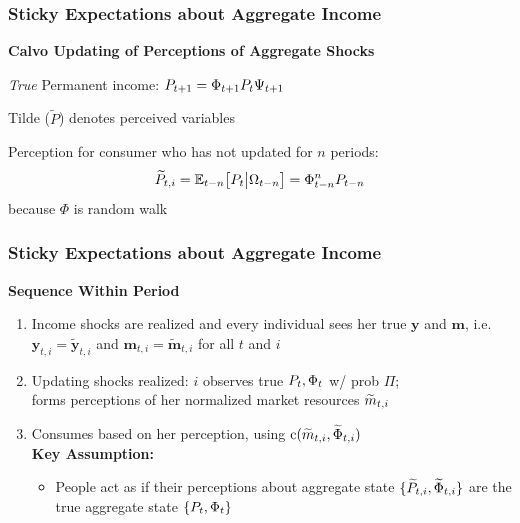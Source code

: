 \documentclass{beamer}\usepackage{dcolumn}
\newcommand{\jemph}[1]{{\color{StataDarkBlue}#1}}
\newcommand{\jbemph}[1]{\textbf{\color{SlideNavy}#1}}
\providecommand{\perc}[1]{\widetilde{#1}}
\providecommand{\jemph}[1]{{\color{jirkasblue}#1}}
\begin{document}
\begin{frame}
\frametitle{Sticky Expectations about Aggregate Income}

\jbemph{\large Calvo Updating of Perceptions of Aggregate Shocks}\\
\bi
\item {\it True} Permanent income: ${P}_{t+1} =  \Phi_{t+1} {P}_{t}\Psi_{t+1}$\\
\item Tilde ($\perc{P}$) denotes perceived variables
\item \jemph{Perception for consumer who has not updated for $n$ periods:}
$$
  \perc{P}_{t,i}=\Ex_{t-n}\big[P_t\big\vert\Omega_{t-n}\big]=\Phi_{t-n}^nP_{t-n}
$$
because $\Phi$ is random walk 
\ei
\end{frame}



\begin{frame}
\frametitle{Sticky Expectations about Aggregate Income}

\jbemph{\large Sequence Within Period}\\
\begin{enumerate}
\setlength{\itemsep}{2mm}
\item Income shocks are realized and every individual sees her true $\mathbf{y}$ and $\mathbf{m}$,
i.e.\ $\mathbf{y}_{t,i}=\perc{\mathbf{y}}_{t,i}$ and $\mathbf{m}_{t,i}=\perc{\mathbf{m}}_{t,i}$ for all $t$ and $i$

\item Updating shocks realized: $i$ observes true $P_t, \Phi_t$ w/ prob $\Pi$;\\
forms perceptions of her normalized market resources $\perc{\mLev}_{t,i}$

\item Consumes based on her perception, \jemph{using $\cFunc(\perc{m}_{t,i},\perc{\PtyGro}_{t,i})$}\\[1mm]

  \jemph{\textbf{Key Assumption:}}\\
    \begin{itemize}
    \item  People act as if their perceptions about aggregate state $\{\perc{P}_{t,i},\perc{\PtyGro}_{t,i}\}$
are the true aggregate state $\{P_t,\Phi_t\}$
    \end{itemize}

\end{enumerate}

\end{frame}
\end{document}

